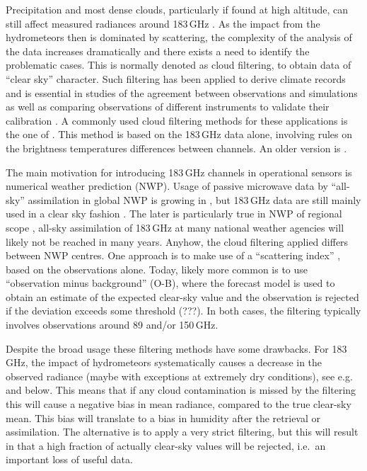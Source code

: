 \documentclass[amt]{copernicus}
\begin{document}
Precipitation and most dense clouds, particularly if found at high altitude, can
still affect measured radiances around 183\,GHz
\citep[e.g.][]{bennartz2003sensitivity}. As the impact from the hydrometeors
then is dominated by scattering, the complexity of the analysis of the data
increases dramatically and there exists a need to identify the problematic
cases. This is normally denoted as cloud filtering, to obtain data of ``clear
sky'' character. Such filtering has been applied to derive climate records
\citep{lang2020new} and is essential in studies of the agreement between
observations and simulations \citep{brogniez2016review} as well as 
comparing observations of different instruments to validate their calibration
\citep{john2013assessment,moradi:retri:15,berg2016intercalibration}. A commonly
used cloud filtering methods for these applications is the one of
\citet{buehler:aclou:07}. This method is based on the 183\,GHz data alone,
involving rules on the brightness temperatures differences between channels. An
older version is \citet{burns1997effects}.

The main motivation for introducing 183\,GHz channels in operational sensors is
numerical weather prediction (NWP). Usage of passive microwave data by
``all-sky'' assimilation in global NWP is growing in \citep{geer2017growing},
but 183\,GHz data are still mainly used in a clear sky fashion
\citep{geer2018all}. The later is particularly true in NWP of regional scope
\citep{gustafsson2018survey}, all-sky assimilation of 183\,GHz at many national
weather agencies will likely not be reached in many years. Anyhow, the cloud
filtering applied differs between NWP centres. One approach is to make use of a
``scattering index'' \citep{bennartz2002precipitation}, based on the
observations alone. Today, likely more common is to use ``observation minus
background'' (O-B), where the forecast model is used to obtain an estimate of
the expected clear-sky value and the observation is rejected if the deviation
exceeds some threshold (???). In both cases, the filtering typically involves
observations around 89 and/or 150\,GHz.

Despite the broad usage these filtering methods have some drawbacks. For
183\,GHz, the impact of hydrometeors systematically causes a decrease in the
observed radiance (maybe with exceptions at extremely dry conditions), see
e.g.\ \citet{barlakas:three:20} and below. This means that if any cloud
contamination is missed by the filtering this will cause a negative bias in
mean radiance, compared to the true clear-sky mean. This bias will translate to
a bias in humidity after the retrieval or assimilation. The alternative is to
apply a very strict filtering, but this will result in that a high fraction of
actually clear-sky values will be rejected, i.e.\ an important loss of useful
data.
\end{document}
